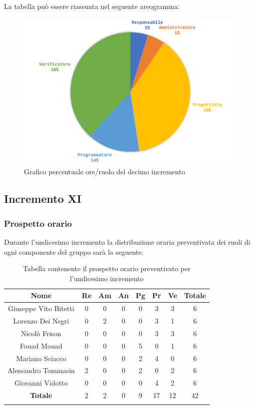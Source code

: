 		La tabella può essere riassunta nel seguente areogramma:
		\begin{figure}[H]
			\centering
			\includegraphics[width=0.8\linewidth]{./images/preventivo/incremento10-2.png}
			\caption{Grafico percentuale ore/ruolo del decimo incremento}
			\label{fig:grafico costi ruolo incremento X}
		\end{figure}
		
		
		
	\subsection{Incremento XI}
		\subsubsection{Prospetto orario}
		Durante l'undicesimo incremento la distribuzione oraria preventivata dei ruoli di ogni componente del gruppo sarà la seguente:
		
		\begin{longtable}{|c|c|c|c|c|c|c|c|}
			\hline
			\rowcolor{lighter-grayer}
			\textbf{Nome} & \textbf{Re} & \textbf{Am} & \textbf{An} & \textbf{Pg}  & \textbf{Pr}   & \textbf{Ve} & \textbf{Totale} \\
			\hline
			\endfirsthead
			
			\hline
			Giuseppe Vito Bitetti 		 & 0 & 0 & 0 & 0 & 3 & 3 & 6\\
			\hline
			\hline
			Lorenzo Dei Negri			 & 0 & 2 & 0 & 0 & 3 & 1 & 6\\
			\hline
			\hline
			Nicolò Frison				      & 0 & 0 & 0 & 0 & 3 & 3 & 6\\
			\hline
			\hline
			Fouad Mouad 				   & 0 & 0 & 0 & 5 & 0 & 1 & 6\\
			\hline
			\hline
			Mariano Sciacco 			 & 0 & 0 & 0 & 2 & 4 & 0 & 6\\
			\hline
			\hline
			Alessandro Tommasin    & 2 & 0 & 0 & 2 & 0 & 2 & 6\\
			\hline
			\hline
			Giovanni Vidotto 			  & 0 & 0 & 0 & 0 & 4 & 2 & 6\\
			\hline 
			\textbf{Totale}			 		& 2 & 2 & 0 & 9 & 17 & 12 & 42\\
			\hline
			\caption{Tabella contenente il prospetto orario preventivato per l'undicesimo incremento}
		\end{longtable}
		\pagebreak
		
